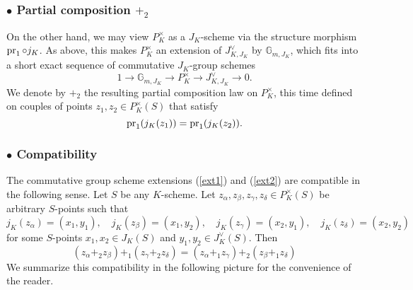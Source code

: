 \documentclass[11pt,oneside]{amsart}
\theoremstyle{plain}
\theoremstyle{definition}
\def\lra{{\longrightarrow}}
\def\G{{\bf G}}
\DeclareMathOperator{\spec}{Spec} \DeclareMathOperator{\sgn}{sign}
\def\G{\mathbb{G}}
\begin{document}
  \subsubsection*{$\bullet$ Partial composition $+_2$} 
     On the other hand, we may view $P_K^\times$ as a  $J_K$-scheme via the structure morphism $\operatorname{pr}_1\circ j_K$. As above, this makes  $P_K^\times$ an extension of $J^\vee_{K, J_K}$ by $\G_{m, J_K}$, %
    which fits into a short exact sequence of commutative $J_K$-group schemes
    \begin{equation}\label{ext2}
        1 \lra \G_{m, J_K} \lra P_K^\times \lra J^\vee_{K, J_K} \lra 0.
    \end{equation} 
   We denote by $+_2$ the resulting partial composition law on $P_K^\times$, this time defined on couples of points $z_1, z_2 \in P_K^\times(S)$ that satisfy 
    \[ \operatorname{pr}_1(j_K(z_1))=\operatorname{pr}_1(j_K(z_2)). \]
    
   \subsubsection*{$\bullet$ Compatibility} 
    The commutative group scheme extensions (\ref{ext1}) and (\ref{ext2}) are compatible in the following sense. Let $S$ be any $K$-scheme. Let $z_\alpha, z_\beta, z_\gamma, z_\delta \in P_K^\times (S)$ be arbitrary   $S$-points such that 
    $$j_K(z_\alpha) = (x_1, y_1), \quad j_K(z_\beta) = (x_1, y_2), \quad j_K(z_\gamma) = (x_2, y_1), \quad j_K(z_\delta) = (x_2, y_2)$$
     for some $S$-points $x_1, x_2\in J_K(S)$ and $y_1, y_2\in J_K^\vee(S)$. Then
    \begin{equation}
        (z_\alpha +_2 z_\beta)+_1 (z_\gamma +_2 z_\delta)=(z_\alpha+_1 z_\gamma)+_2 (z_\beta +_1 z_\delta)
    \end{equation}
We summarize this compatibility in the following picture for the convenience of the reader. 
\end{document}
